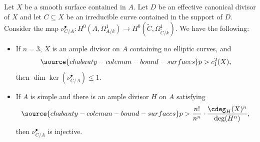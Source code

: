 \begin{lemma}
\notready\label{LemmaSemiInj} Let $X$ be a smooth surface contained in $A$. Let $D$ be an effective canonical divisor of $X$ and let $C\subseteq X$ be an irreducible curve contained in the support of $D$. Consider the map $\nu_{C/A}^\bullet: H^0(A,\Omega^1_{A/k})\to H^0(\widetilde{C},\Omega^1_{\widetilde{C}/k})$. We have the following:
\begin{itemize}
\item[(i)] If $n=3$, $X$ is an ample divisor on $A$ containing no elliptic curves, and %
\begin{equation}\label{EqnSemi1}
\source{chabauty-coleman-bound-surfaces}
p> c_1^2(X),
\end{equation}
then $\dim \ker(\nu_{C/A}^\bullet)\le 1$.
\item[(ii)] If $A$ is simple and there is an ample divisor $H$ on $A$ satisfying
\begin{equation}\label{EqnSemi2}
\source{chabauty-coleman-bound-surfaces}
p>\frac{n!}{n^n}\cdot \frac{\cdeg_H(X)^n}{\deg(H^n)},
\end{equation}
then $\nu_{C/A}^\bullet$ is injective.
\end{itemize}
\end{lemma}
